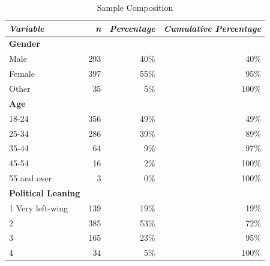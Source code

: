 \documentclass[empirical, authordate, issue]{jote-new-article}
\begin{document}
\begin{table}
  \caption{Sample Composition}
  \label{tab:tableS2}

  \tiny
  \begin{tabularx}{\linewidth}{@{} X  r  r r@{}}

    \toprule
    \emph{Variable}                         & \emph{n} & \emph{Percentage} & \emph{Cumulative Percentage} \\
    \midrule

    \textbf{Gender}                         &          &                   &                              \\
    Male                                    & 293      & 40\%              & 40\%                         \\
    Female                                  & 397      & 55\%              & 95\%                         \\
    Other                                   & 35       & 5\%               & 100\%                        \\
    \textbf{Age}                            &          &                   &                              \\
    18-24                                   & 356      & 49\%              & 49\%                         \\
    25-34                                   & 286      & 39\%              & 89\%                         \\
    35-44                                   & 64       & 9\%               & 97\%                         \\
    45-54                                   & 16       & 2\%               & 100\%                        \\
    55 and over                             & 3        & 0\%               & 100\%                        \\
    \textbf{Political Leaning}              &          &                   &                              \\
    1 Very left-wing                        & 139      & 19\%              & 19\%                         \\
    2                                       & 385      & 53\%              & 72\%                         \\
    3                                       & 165      & 23\%              & 95\%                         \\
    4                                       & 34       & 5\%               & 100\%                        \\

\end{tabularx}
\end{table}
\end{document}
